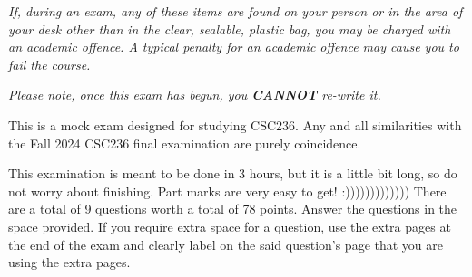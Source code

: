 \documentclass{article}
\begin{document}
\begin{center}
{{            \medskip

            \textit{\large If, during an exam, any of these items are found on your person or in the area of your desk other than in the clear, sealable, plastic bag, you may be charged with an academic offence. A typical penalty for an academic offence may cause you to fail the course.}

            \medskip

            \textit{\large Please note, once this exam has begun, you \textbf{CANNOT} re-write it.}
        }}
    \end{center}

    \noindent This is a mock exam designed for studying CSC236. Any and all similarities with the Fall 2024 CSC236 final examination are purely coincidence.

    \noindent This examination is meant to be done in 3 hours, but it is a little bit long, so do not worry about finishing. Part marks are very easy to get! :))))))))))))) There are a total of 9 questions worth a total of 78 points. Answer the questions in the space provided. If you require extra space for a question, use the extra pages at the end of the exam and clearly label on the said question's page that you are using the extra pages.

    \pagebreak
\end{document}
